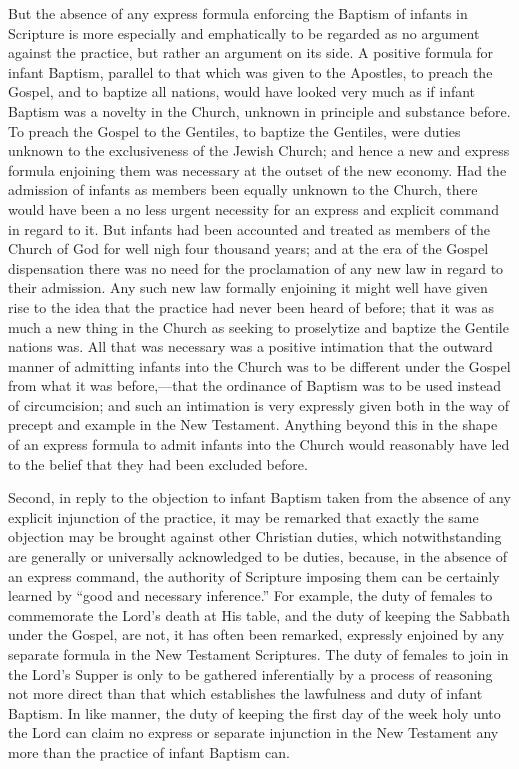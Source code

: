 \documentclass[]{book}
\begin{document}
But the absence of any express formula enforcing the Baptism of infants in Scripture is more especially and emphatically to be regarded as no argument against the practice, but rather an argument on its side. A positive formula for infant Baptism, parallel to that which was given to the Apostles, to preach the Gospel, and to baptize all nations, would have looked very much as if infant Baptism was a novelty in the Church, unknown in principle and substance before. To preach the Gospel to the Gentiles, to baptize the Gentiles, were duties unknown to the exclusiveness of the Jewish Church; and hence a new and express formula enjoining them was necessary at the outset of the new economy. Had the admission of infants as members been equally unknown to the Church, there would have been a no less urgent necessity for an express and explicit command in regard to it. But infants had been accounted and treated as members of the Church of God for well nigh four thousand years; and at the era of the Gospel dispensation there was no need for the proclamation of any new law in regard to their admission. Any such new law formally enjoining it might well have given rise to the idea that the practice had never been heard of before; that it was as much a new thing in the Church as seeking to proselytize and baptize the Gentile nations was. All that was necessary was a positive intimation that the outward manner of admitting infants into the Church was to be different under the Gospel from what it was before,---that the ordinance of Baptism was to be used instead of circumcision; and such an intimation is very expressly given both in the way of precept and example in the New Testament. Anything beyond this in the shape of an express formula to admit infants into the Church would reasonably have led to the belief that they had been excluded before.

Second, in reply to the objection to infant Baptism taken from the absence of any explicit injunction of the practice, it may be remarked that exactly the same objection may be brought against other Christian duties, which notwithstanding are generally or universally acknowledged to be duties, because, in the absence of an express command, the authority of Scripture imposing them can be certainly learned by ``good and necessary inference.'' For example, the duty of females to commemorate the Lord's death at His table, and the duty of keeping the Sabbath under the Gospel, are not, it has often been remarked, expressly enjoined by any separate formula in the New Testament Scriptures. The duty of females to join in the Lord's Supper is only to be gathered inferentially by a process of reasoning not more direct than that which establishes the lawfulness and duty of infant Baptism. In like manner, the duty of keeping the first day of the week holy unto the Lord can claim no express or separate injunction in the New Testament any more than the practice of infant Baptism can.
\end{document}
